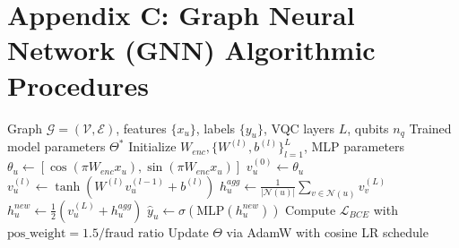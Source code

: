\documentclass[12pt]{article}
\begin{document}
\newpage

\section*{Appendix C: Graph Neural Network (GNN) Algorithmic Procedures}

\begin{algorithm}[H]
\caption{Quantum Graph Neural Network (QGNN) Forward Pass and Training}
\begin{algorithmic}[1]
\REQUIRE Graph $\mathcal{G}=(\mathcal{V},\mathcal{E})$, features $\{x_u\}$, labels $\{y_u\}$, VQC layers $L$, qubits $n_q$
\ENSURE Trained model parameters $\Theta^*$
\STATE Initialize $W_{enc}, \{W^{(l)}, b^{(l)}\}_{l=1}^L$, MLP parameters
        \STATE $\theta_u \leftarrow [\cos(\pi W_{enc}x_u), \sin(\pi W_{enc}x_u)]$
        \STATE $v_u^{(0)} \leftarrow \theta_u$
            \STATE $v_u^{(l)} \leftarrow \tanh(W^{(l)}v_u^{(l-1)} + b^{(l)})$
        \ENDFOR
    \ENDFOR
        \STATE $h_u^{agg} \leftarrow \frac{1}{|\mathcal{N}(u)|} \sum_{v \in \mathcal{N}(u)} v_v^{(L)}$
        \STATE $h_u^{new} \leftarrow \frac{1}{2}(v_u^{(L)} + h_u^{agg})$
        \STATE $\hat{y}_u \leftarrow \sigma(\text{MLP}(h_u^{new}))$
    \ENDFOR
    \STATE Compute $\mathcal{L}_{BCE}$ with $\text{pos\_weight} = 1.5 / \text{fraud ratio}$
    \STATE Update $\Theta$ via AdamW with cosine LR schedule
\ENDFOR
\end{algorithmic}
\end{algorithm}

\vspace{1em}
\end{document}

